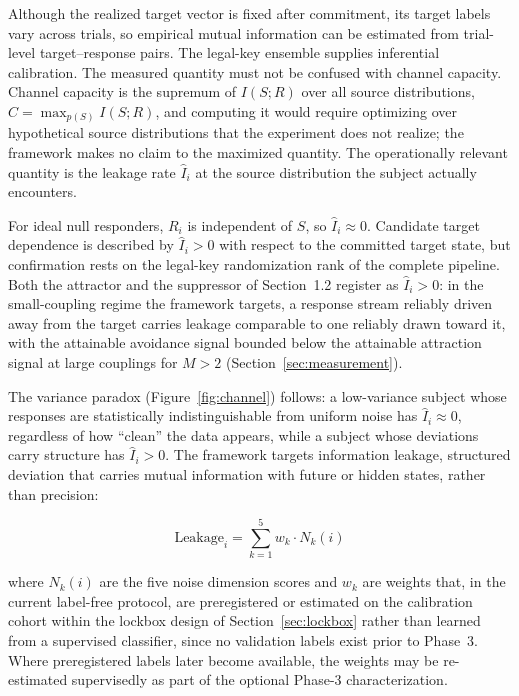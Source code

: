 \documentclass[11pt,letterpaper]{article}
\begin{document}
Although the realized target vector is fixed after commitment, its target labels vary across trials, so empirical mutual information can be estimated from trial-level target--response pairs. The legal-key ensemble supplies inferential calibration. The measured quantity must not be confused with channel capacity. Channel capacity is the supremum of $I(S;R)$ over all source distributions, $C = \max_{p(S)} I(S;R)$, and computing it would require optimizing over hypothetical source distributions that the experiment does not realize; the framework makes no claim to the maximized quantity. The operationally relevant quantity is the leakage rate $\hat{I}_i$ at the source distribution the subject actually encounters.

For ideal null responders, $R_i$ is independent of $S$, so $\hat{I}_i \approx 0$. Candidate target dependence is described by $\hat{I}_i > 0$ with respect to the committed target state, but confirmation rests on the legal-key randomization rank of the complete pipeline. Both the attractor and the suppressor of Section~1.2 register as $\hat{I}_i > 0$: in the small-coupling regime the framework targets, a response stream reliably driven away from the target carries leakage comparable to one reliably drawn toward it, with the attainable avoidance signal bounded below the attainable attraction signal at large couplings for $M > 2$ (Section~\ref{sec:measurement}).

The variance paradox (Figure~\ref{fig:channel}) follows: a low-variance subject whose responses are statistically indistinguishable from uniform noise has $\hat{I}_i \approx 0$, regardless of how ``clean'' the data appears, while a subject whose deviations carry structure has $\hat{I}_i > 0$. The framework targets information leakage, structured deviation that carries mutual information with future or hidden states, rather than precision:

\begin{equation}
\text{Leakage}_i = \sum_{k=1}^{5} w_k \cdot N_k(i)
\end{equation}

where $N_k(i)$ are the five noise dimension scores and $w_k$ are weights that, in the current label-free protocol, are preregistered or estimated on the calibration cohort within the lockbox design of Section~\ref{sec:lockbox} rather than learned from a supervised classifier, since no validation labels exist prior to Phase~3. Where preregistered labels later become available, the weights may be re-estimated supervisedly as part of the optional Phase-3 characterization.
\end{document}
